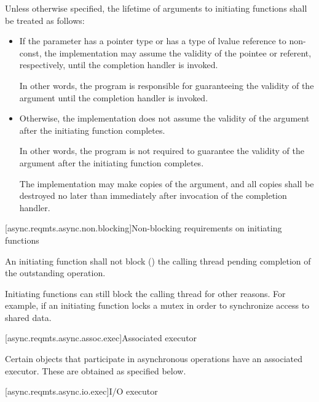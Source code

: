 %
\pnum
 Unless otherwise specified, the lifetime of arguments to initiating functions shall be treated as follows:

\begin{itemize}
\item
If the parameter has a pointer type or has a type of lvalue reference to non-const, the implementation may assume the validity of the pointee or referent, respectively, until the completion handler is invoked. \begin{note} In other words, the program is responsible for guaranteeing the validity of the argument until the completion handler is invoked. \end{note}

\item
Otherwise, the implementation does not assume the validity of the argument after the initiating function completes. \begin{note} In other words, the program is not required to guarantee the validity of the argument after the initiating function completes. \end{note} The implementation may make copies of the argument, and all copies shall be destroyed no later than immediately after invocation of the completion handler.
\end{itemize}



[async.reqmts.async.non.blocking]{Non-blocking requirements on initiating functions}

%
\pnum
 An initiating function shall not block () the calling thread pending completion of the outstanding operation.

\pnum
 \begin{note} Initiating functions can still block the calling thread for other reasons. For example, if an initiating function locks a mutex in order to synchronize access to shared data. \end{note}



[async.reqmts.async.assoc.exec]{Associated executor}

%
\pnum
Certain objects that participate in asynchronous operations have an associated executor. These are obtained as specified below.



[async.reqmts.async.io.exec]{I/O executor}

